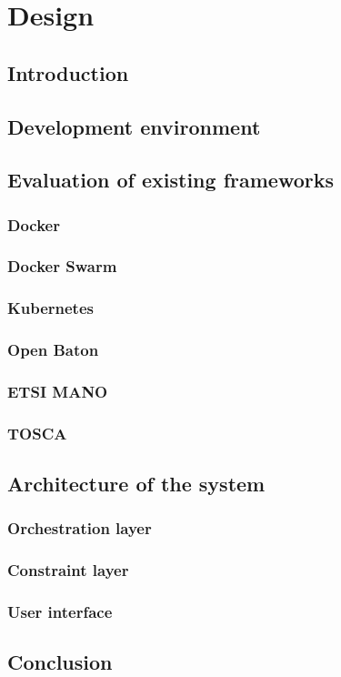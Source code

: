 \chapter{Design}

\section{Introduction}

\section{Development environment}

\section{Evaluation of existing frameworks}

\subsection{Docker}

\subsection{Docker Swarm}

\subsection{Kubernetes}

\subsection{Open Baton}

\subsection{ETSI MANO}

\subsection{TOSCA}

\section{Architecture of the system}

\subsection{Orchestration layer}

\subsection{Constraint layer}

\subsection{User interface}

\section{Conclusion}
